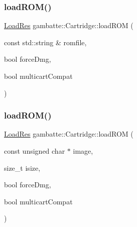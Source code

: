 \mbox{\label{classgambatte_1_1Cartridge_a28bde5fa09184ce6376555d85773c18f}} 
\subsubsection{\texorpdfstring{load\+R\+O\+M()}{loadROM()}\hspace{0.1cm}{\footnotesize\ttfamily [1/3]}}
{\footnotesize\ttfamily \hyperlink{namespacegambatte_a42606f494711d2e2870a5f5cdf69e468}{Load\+Res} gambatte\+::\+Cartridge\+::load\+R\+OM (\begin{DoxyParamCaption}\item[{const std\+::string \&}]{romfile,  }\item[{bool}]{force\+Dmg,  }\item[{bool}]{multicart\+Compat }\end{DoxyParamCaption})}

\mbox{\label{classgambatte_1_1Cartridge_ae6da096ff5dbaf07d3af3d581819237f}} 
\subsubsection{\texorpdfstring{load\+R\+O\+M()}{loadROM()}\hspace{0.1cm}{\footnotesize\ttfamily [2/3]}}
{\footnotesize\ttfamily \hyperlink{namespacegambatte_a42606f494711d2e2870a5f5cdf69e468}{Load\+Res} gambatte\+::\+Cartridge\+::load\+R\+OM (\begin{DoxyParamCaption}\item[{const unsigned char $\ast$}]{image,  }\item[{size\+\_\+t}]{isize,  }\item[{bool}]{force\+Dmg,  }\item[{bool}]{multicart\+Compat }\end{DoxyParamCaption})}

\mbox{\label{classgambatte_1_1Cartridge_a2e7d7b90840269e9cd4a0c195556f53f}} 
